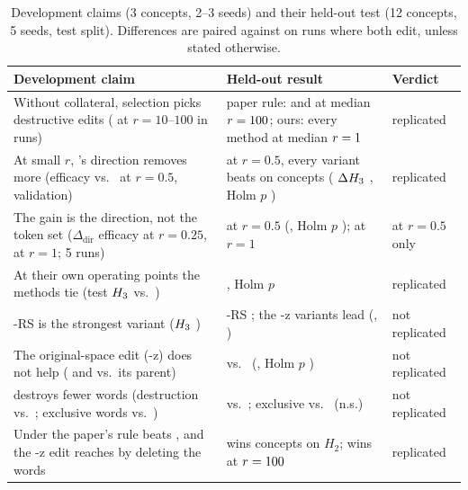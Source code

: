 \begin{table}[ht]
\centering
\footnotesize
\setlength{\tabcolsep}{3pt}
\begin{tabular}{@{}P{2.7cm}P{3.1cm}P{1.3cm}@{}}
\toprule
Development claim & Held-out result & Verdict \\
\midrule
Without collateral, selection picks destructive edits (\ember{} at $r = 10$--$100$ in  runs) & paper rule: \ember{} and \cinderz{} at median $r = 100$; ours: every method at median $r = 1$ & replicated \\
\addlinespace
At small $r$, \cinder{}'s direction removes more (efficacy  vs.\  at $r = 0.5$, validation) & at $r = 0.5$, every variant beats \ember{} on  concepts (\cinder{} $\Delta H_{3}$ , Holm $p$ ) & replicated \\
\addlinespace
The gain is the direction, not the token set ($\Delta_{\text{dir}}$ efficacy  at $r = 0.25$,  at $r = 1$; 5 runs) &  at $r = 0.5$ (, Holm $p$ );  at $r = 1$ & at $r = 0.5$ only \\
\addlinespace
At their own operating points the methods tie (test $H_{3}$  vs.\ ) & \cinder{} , Holm $p$  & replicated \\
\addlinespace
\cinder{}-RS is the strongest variant ($H_{3}$ ) & \cinder{}-RS ; the -z variants lead (, ) & not replicated \\
\addlinespace
The original-space edit (-z) does not help ( and  vs.\ its parent) & \cinderz{}  vs.\ \ember{} (, Holm $p$ ) & not replicated \\
\addlinespace
\cinder{} destroys fewer words (destruction  vs.\ ; exclusive words  vs.\ ) &  vs.\ ; exclusive  vs.\  (n.s.) & not replicated \\
\addlinespace
Under the paper's rule \ember{} beats \cinder{}, and the -z edit reaches \ember{} by deleting the words & \cinder{} wins  concepts on $H_2$; \cinderz{} wins  at $r = 100$ & replicated \\
\bottomrule
\end{tabular}
\caption{Development claims (3 concepts, 2--3 seeds) and their held-out test (12 concepts, 5 seeds, test split). Differences are paired against \ember{} on runs where both edit, unless stated otherwise.}
\label{tab:devclaims}
\end{table}

